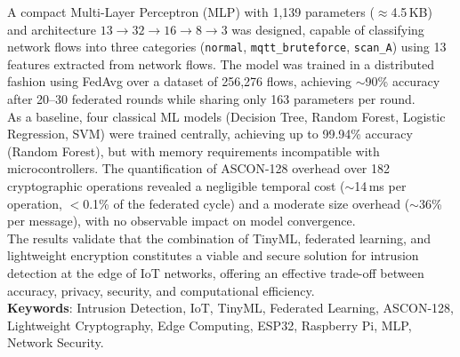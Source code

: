 A compact Multi-Layer Perceptron (MLP) with 1,139 parameters ($\approx$4.5\,KB) and architecture $13 \to 32 \to 16 \to 8 \to 3$ was designed, capable of classifying network flows into three categories (\texttt{normal}, \texttt{mqtt\_bruteforce}, \texttt{scan\_A}) using 13 features extracted from network flows. The model was trained in a distributed fashion using FedAvg over a dataset of 256,276 flows, achieving $\sim$90\% accuracy after 20--30 federated rounds while sharing only 163 parameters per round.\\

As a baseline, four classical ML models (Decision Tree, Random Forest, Logistic Regression, SVM) were trained centrally, achieving up to 99.94\% accuracy (Random Forest), but with memory requirements incompatible with microcontrollers. The quantification of ASCON-128 overhead over 182 cryptographic operations revealed a negligible temporal cost ($\sim$14\,ms per operation, $<$0.1\% of the federated cycle) and a moderate size overhead ($\sim$36\% per message), with no observable impact on model convergence.\\

The results validate that the combination of TinyML, federated learning, and lightweight encryption constitutes a viable and secure solution for intrusion detection at the edge of IoT networks, offering an effective trade-off between accuracy, privacy, security, and computational efficiency.\\


{\small \textbf{Keywords}: Intrusion Detection, IoT, TinyML, Federated Learning, ASCON-128, Lightweight Cryptography, Edge Computing, ESP32, Raspberry Pi, MLP, Network Security.}
